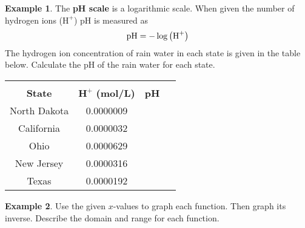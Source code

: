 \documentclass{report}
\theoremstyle{definition}
\newtheorem{example}{\bf Example}
\begin{document}
\begin{example}
The \textbf{pH scale} is a logarithmic scale. When given the number of hydrogen ions ($\text{H}^+$) pH is measured as
\[\text{pH}=-\log\big{(}\text{H}^+\big{)}\]
The hydrogen ion concentration of rain water in each state is given in the table below. Calculate the pH of the rain water for each state.
\end{example}

\begin{tabular}[t]{|c|c|c|}
\hline
&&\\
\textbf{State}&$\mathbf{\text{H}^+}$  \textbf{(mol/L)} & \textbf{pH} \,\,\,\,\,\\
\hline
North Dakota & 0.0000009 & \\
\hline
California & 0.0000032 & \\
\hline
Ohio & 0.0000629 &\\
\hline
New Jersey & 0.0000316 & \\
\hline
Texas & 0.0000192 &\\
\hline
\end{tabular}
\vfill


 \newpage
 
 
 
 \begin{example}
Use the given $x$-values to graph each function. Then graph its inverse. Describe the domain and range for each function.
 \end{example}
 
\end{document}
